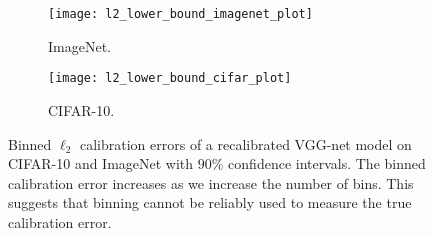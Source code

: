 \begin{figure}
     \centering
     \begin{subfigure}[b]{0.4\textwidth}
         \centering
         \texttt{[image: l2\_lower\_bound\_imagenet\_plot]}
         \caption{ImageNet.}
         \label{fig:imagenet_lower_bound}
     \end{subfigure}
     \hfill
     \begin{subfigure}[b]{0.4\textwidth}
         \centering
         \texttt{[image: l2\_lower\_bound\_cifar\_plot]}
         \caption{CIFAR-10.}
         \label{fig:cifar_10_lower_bound}
     \end{subfigure}
        \caption{
        Binned $\ell_2$ calibration errors of a recalibrated VGG-net model on CIFAR-10 and ImageNet with $90\%$ confidence intervals. The binned calibration error increases as we increase the number of bins. This suggests that binning cannot be reliably used to measure the true calibration error.
        }
        \label{fig:lower_bounds}
\end{figure}







